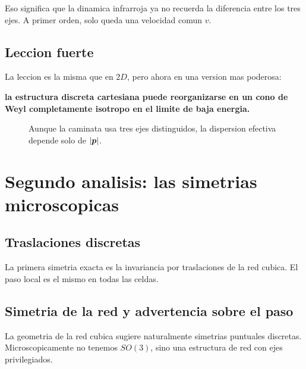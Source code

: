 Eso significa que la dinamica infrarroja ya no recuerda la diferencia entre los tres ejes. A primer orden, solo queda una velocidad comun \(v\).

\subsection{Leccion fuerte}
La leccion es la misma que en \(2D\), pero ahora en una version mas poderosa:
\begin{displayquote}
\textbf{la estructura discreta cartesiana puede reorganizarse en un cono de Weyl completamente isotropo en el limite de baja energia.}
\end{displayquote}

\begin{figure}[h!]
\centering
{}
\caption{Aunque la caminata usa tres ejes distinguidos, la dispersion efectiva depende solo de \(\abs{\bm{p}}\).}
\end{figure}

\section{Segundo analisis: las simetrias microscopicas}
\subsection{Traslaciones discretas}
La primera simetria exacta es la invariancia por traslaciones de la red cubica. El paso local es el mismo en todas las celdas.

\subsection{Simetria de la red y advertencia sobre el paso}
La geometria de la red cubica sugiere naturalmente simetrias puntuales discretas. Microscopicamente no tenemos \(SO(3)\), sino una estructura de red con ejes privilegiados.

